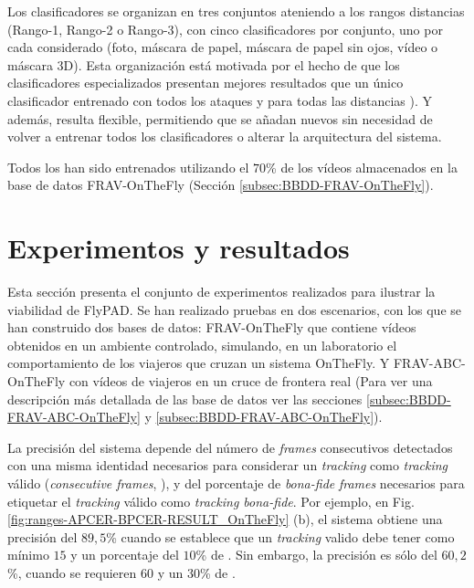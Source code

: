 Los clasificadores se organizan en tres conjuntos ateniendo a los rangos distancias (Rango-1, Rango-2 o Rango-3), con cinco clasificadores por conjunto, uno por cada  considerado (foto, máscara de papel, máscara de papel sin ojos, vídeo o máscara $3$D). Esta organización está motivada por el hecho de que los clasificadores especializados presentan mejores resultados que un único clasificador entrenado con todos los ataques y para todas las distancias \cite{goto2011pedestrian}). Y además, resulta flexible, permitiendo que se añadan nuevos  sin necesidad de volver a entrenar todos los clasificadores o alterar la arquitectura del sistema.

Todos los  han sido entrenados utilizando el $70$\% de los vídeos almacenados en la base de datos \Gls{FRAV-OnTheFly} (Sección \ref{subsec:BBDD-FRAV-OnTheFly}).

\section{Experimentos y resultados}\label{sec:ExpermentosFlayPAD}

Esta sección presenta el conjunto de experimentos realizados para ilustrar la viabilidad de \gls{FlyPAD}. Se han realizado pruebas en dos escenarios, con los que se han construido dos bases de datos: \Gls{FRAV-OnTheFly} que contiene vídeos obtenidos en un ambiente controlado, simulando, en un laboratorio el comportamiento de los viajeros que cruzan un sistema  \gls{OnTheFly}. Y \Gls{FRAV-ABC-OnTheFly} con vídeos de viajeros en un cruce de frontera real (Para ver una descripción más detallada de las base de datos ver las secciones \ref{subsec:BBDD-FRAV-ABC-OnTheFly} y \ref{subsec:BBDD-FRAV-ABC-OnTheFly}).

La precisión del sistema depende del número de \textit{frames} consecutivos detectados con una misma identidad necesarios para considerar un \textit{tracking} como \textit{tracking} válido (\textit{consecutive frames}, ), y del  porcentaje de \textit{bona-fide} \textit{frames}  necesarios para etiquetar el \textit{tracking} válido como \textit{tracking \gls{bona-fide}}. Por ejemplo, en Fig. \ref{fig:ranges-APCER-BPCER-RESULT_OnTheFly} (b), el sistema obtiene una precisión del $89,5$\% cuando se establece que un \textit{tracking} valido debe tener como mínimo $15$  y un porcentaje del $10$\% de . Sin embargo, la precisión es sólo del $60,2$\%, cuando se requieren  $60$  y un $30$\% de .

